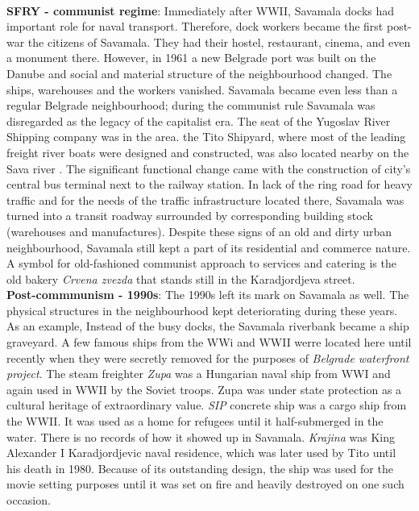 \documentclass[11pt]{report}
\begin{document}
\\
\textbf{SFRY - communist regime}:
Immediately after WWII, Savamala docks had important role for naval transport. Therefore, dock workers became the first post-war the citizens of Savamala. They had their hostel, restaurant, cinema, and even a monument there. However, in 1961 a new Belgrade port was built on the Danube and social and material structure of the neighbourhood changed. The ships, warehouses and the workers vanished.
Savamala became even less than a regular Belgrade neighbourhood; during the communist rule Savamala was disregarded as the legacy of the capitalist era.
The seat of the Yugoslav River Shipping company was in the area. the Tito Shipyard, where most of the leading freight river boats were designed and constructed, was also located nearby on the Sava river \cite{ref and Kamenzind2}. 
The significant functional change came with the construction of city's central bus terminal next to the railway station. In lack of the ring road for heavy traffic and for the needs of the traffic infrastructure located there, Savamala was turned into a transit roadway surrounded by corresponding building stock (warehouses and manufactures).
Despite these signs of an old and dirty urban neighbourhood, Savamala still kept a part of its residential and commerce nature. A symbol for old-fashioned communist approach to services and catering is the old bakery \textit{Crvena zvezda} that stands still in the Karadjordjeva street.
\\
\textbf{Post-commmunism - 1990s}:
The 1990s left its mark on Savamala as well.
The physical structures in the neighbourhood kept deteriorating during these years. 
As an example, Instead of the busy docks, the Savamala riverbank became a ship graveyard. A few famous ships from the WWi and WWII werre located here until recently when they were secretly removed for the purposes of \textit{Belgrade waterfront project}.
The steam freighter \textit{Zupa} was a Hungarian naval ship from WWI and again used in WWII by the Soviet troops. Zupa was under state protection as a cultural heritage of extraordinary value.
\textit{SIP} concrete ship was a cargo ship from the WWII. It was used as a home for refugees until it half-submerged in the water. There is no records of how it showed up in Savamala. 
\textit{Krajina} was King Alexander I Karadjordjevic naval residence, which was later used by Tito until his death in 1980. Because of its outstanding design, the ship was used for the movie setting purposes until it was set on fire and heavily destroyed on one such occasion.
\end{document}
